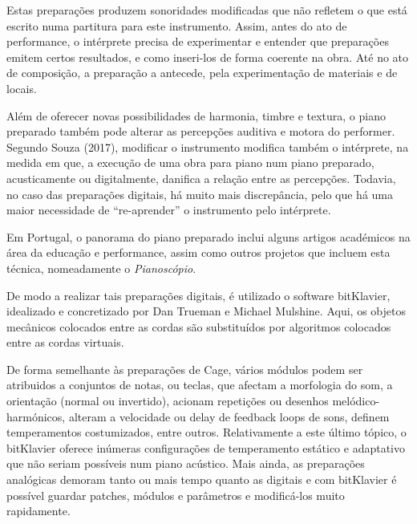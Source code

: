 \documentclass[../main.tex]{subfiles}
\begin{document}
Estas preparações produzem sonoridades modificadas que não refletem o que está escrito numa partitura para este instrumento.
Assim, antes do ato de performance, o intérprete precisa de experimentar e entender que preparações emitem certos resultados, e como inseri-los de forma coerente na obra.
Até no ato de composição, a preparação a antecede, pela experimentação de materiais e de locais\cite{cage1958}.

Além de oferecer novas possibilidades de harmonia, timbre e textura, o piano preparado também pode alterar as percepções auditiva e motora do performer.
Segundo Souza (2017), modificar o instrumento modifica também o intérprete, na medida em que, a execução de uma obra para piano num piano preparado, acusticamente ou digitalmente, danifica a relação entre as percepções.
Todavia, no caso das preparações digitais, há muito mais discrepância, pelo que há uma maior necessidade de \enquote{re-aprender} o instrumento pelo intérprete\cite{souza2017}.

Em Portugal, o panorama do piano preparado inclui alguns artigos académicos na área da educação\cite{tsanko2020} e performance\cite{miguel2021}, assim como outros projetos que incluem esta técnica, nomeadamente o \textit{Pianoscópio}\cite{vaz2016,cmt2021}. 

De modo a realizar tais preparações digitais, é utilizado o software bitKlavier, idealizado e concretizado por Dan Trueman e Michael Mulshine\cite{trueman2019}.
Aqui, os objetos mecânicos colocados entre as cordas são substituídos por algoritmos colocados entre as cordas virtuais.

De forma semelhante às preparações de Cage, vários módulos podem ser atribuidos a conjuntos de notas, ou teclas, que afectam a morfologia do som, a orientação (normal ou invertido), acionam repetições ou desenhos melódico-harmónicos, alteram a velocidade ou delay de feedback loops de sons, definem temperamentos costumizados, entre outros.
Relativamente a este último tópico, o bitKlavier oferece inúmeras configurações de temperamento estático e adaptativo que não seriam possíveis num piano acústico\cite{trueman2019b}.
Mais ainda, as preparações analógicas demoram tanto ou mais tempo quanto as digitais e com bitKlavier é possível guardar patches, módulos e parâmetros e modificá-los muito rapidamente\cite{trueman2019}.
\end{document}
